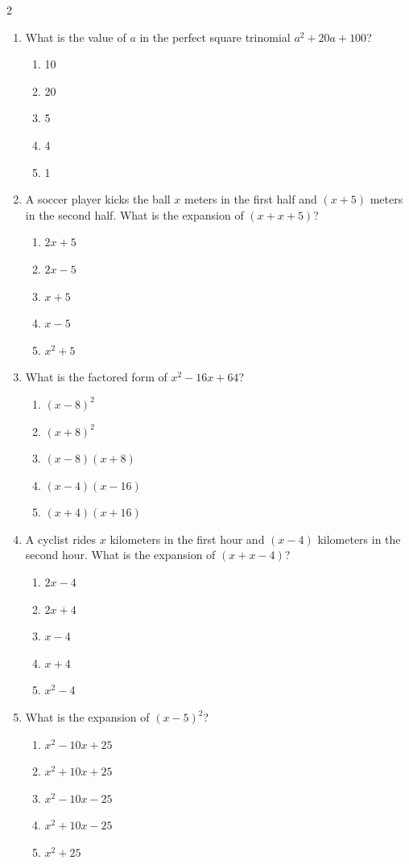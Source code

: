 \documentclass[10pt]{article}
\begin{document}
\begin{multicols}{2}
\begin{enumerate}[label=\textbf{Q\arabic*.}, leftmargin=*, itemsep=6pt, parsep=0pt]
  \item \small What is the value of $a$ in the perfect square trinomial $a^2 + 20a + 100$?
  \begin{enumerate}[label=(\Alph*), leftmargin=0.6cm, nosep, itemsep=2pt]
    \item 10
    \item 20
    \item 5
    \item 4
    \item 1
  \end{enumerate}

  \item \small A soccer player kicks the ball $x$ meters in the first half and $(x+5)$ meters in the second half. What is the expansion of $(x+x+5)$?
  \begin{enumerate}[label=(\Alph*), leftmargin=0.6cm, nosep, itemsep=2pt]
    \item $2x+5$
    \item $2x-5$
    \item $x+5$
    \item $x-5$
    \item $x^2+5$
  \end{enumerate}

  \item \small What is the factored form of $x^2 - 16x + 64$?
  \begin{enumerate}[label=(\Alph*), leftmargin=0.6cm, nosep, itemsep=2pt]
    \item $(x-8)^2$
    \item $(x+8)^2$
    \item $(x-8)(x+8)$
    \item $(x-4)(x-16)$
    \item $(x+4)(x+16)$
  \end{enumerate}

  \item \small A cyclist rides $x$ kilometers in the first hour and $(x-4)$ kilometers in the second hour. What is the expansion of $(x+x-4)$?
  \begin{enumerate}[label=(\Alph*), leftmargin=0.6cm, nosep, itemsep=2pt]
    \item $2x-4$
    \item $2x+4$
    \item $x-4$
    \item $x+4$
    \item $x^2-4$
  \end{enumerate}

  \item \small What is the expansion of $(x-5)^2$?
  \begin{enumerate}[label=(\Alph*), leftmargin=0.6cm, nosep, itemsep=2pt]
    \item $x^2 - 10x + 25$
    \item $x^2 + 10x + 25$
    \item $x^2 - 10x - 25$
    \item $x^2 + 10x - 25$
    \item $x^2 + 25$
  \end{enumerate}


\end{enumerate}
\end{multicols}
\end{document}
